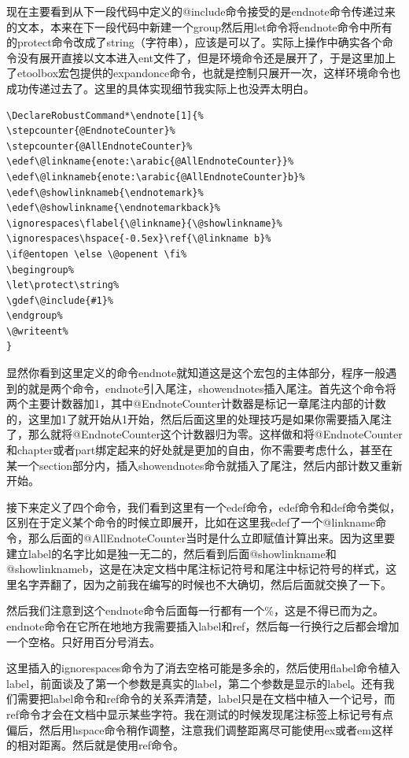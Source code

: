 \documentclass[12pt,oneside]{book}
\begin{document}
\begin{common-format}
现在主要看到从下一段代码中定义的@include命令接受的是endnote命令传递过来的文本，本来在下一段代码中新建一个group然后用let命令将endnote命令中所有的protect命令改成了string（字符串），应该是可以了。实际上操作中确实各个命令没有展开直接以文本进入ent文件了，但是环境命令还是展开了，于是这里加上了etoolbox宏包提供的expandonce命令，也就是控制只展开一次，这样环境命令也成功传递过去了。这里的具体实现细节我实际上也没弄太明白。

\begin{Verbatim}
\DeclareRobustCommand*\endnote[1]{%
\stepcounter{@EndnoteCounter}%
\stepcounter{@AllEndnoteCounter}%
\edef\@linkname{enote:\arabic{@AllEndnoteCounter}}%
\edef\@linknameb{enote:\arabic{@AllEndnoteCounter}b}%
\edef\@showlinknameb{\endnotemark}%
\edef\@showlinkname{\endnotemarkback}%
\ignorespaces\flabel{\@linkname}{\@showlinkname}%
\ignorespaces\hspace{-0.5ex}\ref{\@linkname b}%
\if@entopen \else \@openent \fi%
\begingroup%
\let\protect\string%
\gdef\@include{#1}%
\endgroup%
\@writeent%
}
\end{Verbatim}
显然你看到这里定义的命令endnote就知道这是这个宏包的主体部分，程序一般遇到的就是两个命令，endnote引入尾注，showendnotes插入尾注。首先这个命令将两个主要计数器加1，其中@EndnoteCounter计数器是标记一章尾注内部的计数的，这里加1了就开始从1开始，然后后面这里的处理技巧是如果你需要插入尾注了，那么就将@EndnoteCounter这个计数器归为零。这样做和将@EndnoteCounter和chapter或者part绑定起来的好处就是更加的自由，你不需要考虑什么，甚至在某一个section部分内，插入showendnotes命令就插入了尾注，然后内部计数又重新开始。

接下来定义了四个命令，我们看到这里有一个edef命令，edef命令和def命令类似，区别在于定义某个命令的时候立即展开，比如在这里我edef了一个@linkname命令，那么后面的@AllEndnoteCounter当时是什么立即赋值计算出来。因为这里要建立label的名字比如是独一无二的，然后看到后面@showlinkname和@showlinknameb，这是在决定文档中尾注标记符号和尾注中标记符号的样式，这里名字弄翻了，因为之前我在编写的时候也不大确切，然后后面就交换了一下。

然后我们注意到这个endnote命令后面每一行都有一个\%，这是不得已而为之。endnote命令在它所在地地方我需要插入label和ref，然后每一行换行之后都会增加一个空格。只好用百分号消去。

这里插入的ignorespaces命令为了消去空格可能是多余的，然后使用flabel命令植入label，前面谈及了第一个参数是真实的label，第二个参数是显示的label。还有我们需要把label命令和ref命令的关系弄清楚，label只是在文档中植入一个记号，而ref命令才会在文档中显示某些字符。我在测试的时候发现尾注标签上标记号有点偏后，然后用hspace命令稍作调整，注意我们调整距离尽可能使用ex或者em这样的相对距离。然后就是使用ref命令。


\end{common-format}
\end{document}

